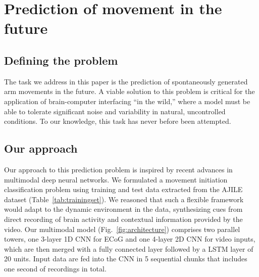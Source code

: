 \documentclass[letterpaper]{article} %
\begin{document}
\section{Prediction of movement in the future}
\subsection{Defining the problem}

The task we address in this paper is the prediction of spontaneously generated arm movements in the future.
A viable solution to this problem is critical for the application of brain-computer interfacing ``in the wild,'' where a model must be able to tolerate significant noise and variability in natural, uncontrolled conditions. 
To our knowledge, this task has never before been attempted.


\subsection{Our approach}

Our approach to this prediction problem is inspired by recent advances in multimodal deep neural networks.
We formulated a movement initiation classification problem using training and test data extracted from the AJILE dataset (Table~\ref{tab:trainingset}).
We reasoned that such a flexible framework would adapt to the dynamic environment in the data, synthesizing cues from direct recording of brain activity and contextual information provided by the video.
Our multimodal model (Fig.~\ref{fig:architecture}) comprises two parallel towers, one 3-layer 1D CNN for ECoG and one 4-layer 2D CNN for video inputs, which are then merged with a fully connected layer followed by a LSTM layer of 20 units.
Input data are fed into the CNN in 5 sequential chunks that includes one second of recordings in total. 
\end{document}
